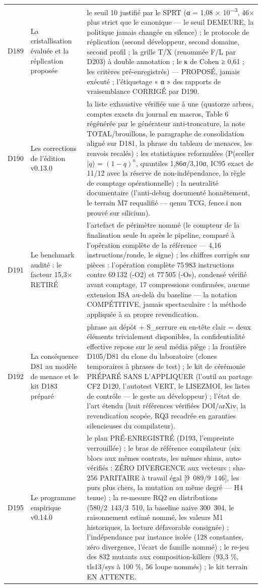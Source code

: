 \begin{longtable}{@{}p{1.6cm} p{4.6cm} >{\raggedright\arraybackslash}p{9.5cm}@{}}
D189 & La cristallisation évaluée et la réplication proposée & le seuil
10 justifié par le SPRT (α = 1,08 × 10\textsuperscript{−3}, 46× plus
strict que le canonique — le seuil DEMEURE, la politique jamais changée
en silence) ; le protocole de réplication (second développeur, second
domaine, second profil ; la grille T/X (renommée F/L par D203) à
double annotation ; le κ de
Cohen ≥ 0,61 ; les critères pré-enregistrés) — PROPOSÉ, jamais exécuté ;
l'étiquetage « α » des rapports de vraisemblance CORRIGÉ par D190. \\
D190 & Les corrections de l'édition v0.13.0 & la liste exhaustive vérifiée une à une (quatorze arbres, comptes exacts du journal en macros, Table 6 régénérée par le générateur anti-troncature, la note TOTAL/brouillons, le paragraphe de consolidation aligné sur D181, la phrase du tableau de menaces, les renvois recalés) ; les statistiques reformulées (P(sceller$|q$) = $(1-q)^n$, quantiles 1,86σ/3,10σ, IC95 exact de 11/12 avec la réserve de non-indépendance, la règle de comptage opérationnelle) ; la neutralité documentaire (l'anti-debug documenté honnêtement, le terrain M7 requalifié — qemu TCG, fence.i non prouvé sur silicium). \\
D191 & Le benchmark audité : le facteur 15,3× RETIRÉ & l'artefact de périmètre nommé (le compteur de la finalisation seule lu après le pipeline, comparé à l'opération complète de la référence — 4,16 instructions/ronde, le signe) ; les chiffres corrigés sur pièces : l'opération complète 75\,983 instructions contre 69\,132 (-O2) et 77\,505 (-Os), condensé vérifié avant comptage, 17 compressions confirmées, aucune extension ISA au-delà du baseline — la notation COMPÉTITIVE, jamais spectaculaire : la méthode appliquée à sa propre revendication. \\
D192 & La conséquence D81 au modèle de menace et le kit D183 préparé & phrase au dépôt + S\_serrure en en-tête clair = deux éléments trivialement disponibles, la confidentialité effective repose sur le seul média piège ; la frontière D105/D81 du clone du laboratoire (clones temporaires à phrases de test) ; le kit de cérémonie PRÉPARÉ SANS L'APPLIQUER (l'outil au partage CF2 D120, l'autotest VERT, le LISEZMOI, les listes de contrôle — le geste au développeur) ; l'état de l'art étendu (huit références vérifiées DOI/arXiv, la revendication scopée, RQ3 recadrée en garanties silencieuses du compilateur). \\
D195 & Le programme empirique v0.14.0 & le plan PRÉ-ENREGISTRÉ (D193, l'empreinte verrouillée) ; le bras de référence compilateur (six blocs aux mêmes contrats, les mêmes shims, auto-vérifiés : ZÉRO DIVERGENCE aux vecteurs ; sha-256 PARITAIRE à travail égal [9~089/9~146], les purs plus chers, la mutation au même degré — H4 tenue) ; la re-mesure RQ2 en distributions (580/2~143/3~510, la baseline naive 300~304, le raisonnement estimé nommé, les valeurs M1 historiques, la lecture défavorable consignée) ; l'indépendance par instance isolée (128 constantes, zéro divergence, l'écart de famille nommé) ; le re-jeu des 832 mutants aux composition-killers (93,3 \%, tls13/sys à 100 \%, 56 loupe nommés) ; le kit terrain EN ATTENTE. \\

\end{longtable}
